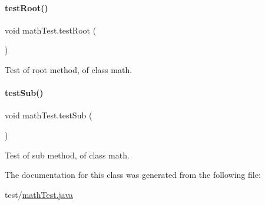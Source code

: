 \paragraph{\texorpdfstring{test\+Root()}{testRoot()}}
{\footnotesize\ttfamily void math\+Test.\+test\+Root (\begin{DoxyParamCaption}{ }\end{DoxyParamCaption})\hspace{0.3cm}{\ttfamily [inline]}}

Test of root method, of class math. \mbox{\label{classmathTest_a11b3f5b6f8b8a05fdf31b1953b0affcd}} 
\paragraph{\texorpdfstring{test\+Sub()}{testSub()}}
{\footnotesize\ttfamily void math\+Test.\+test\+Sub (\begin{DoxyParamCaption}{ }\end{DoxyParamCaption})\hspace{0.3cm}{\ttfamily [inline]}}

Test of sub method, of class math. 

The documentation for this class was generated from the following file\+:\begin{DoxyCompactItemize}
\item 
test/\hyperlink{mathTest_8java}{math\+Test.\+java}\end{DoxyCompactItemize}
